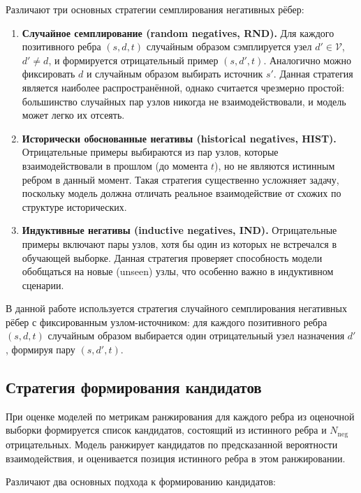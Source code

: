 \documentclass[a4paper,12pt]{extarticle}
\begin{document}
Различают три основных стратегии семплирования негативных рёбер:

\begin{enumerate}
    \item \textbf{Случайное семплирование (random negatives, RND).} Для каждого позитивного ребра $(s, d, t)$ случайным образом сэмплируется узел $d' \in \mathcal{V}$, $d' \neq d$, и формируется отрицательный пример $(s, d', t)$. Аналогично можно фиксировать $d$ и случайным образом выбирать источник $s'$. Данная стратегия является наиболее распространённой, однако считается чрезмерно простой: большинство случайных пар узлов никогда не взаимодействовали, и модель может легко их отсеять.

    \item \textbf{Исторически обоснованные негативы (historical negatives, HIST).} Отрицательные примеры выбираются из пар узлов, которые взаимодействовали в прошлом (до момента $t$), но не являются истинным ребром в данный момент. Такая стратегия существенно усложняет задачу, поскольку модель должна отличать реальное взаимодействие от схожих по структуре исторических.

    \item \textbf{Индуктивные негативы (inductive negatives, IND).} Отрицательные примеры включают пары узлов, хотя бы один из которых не встречался в обучающей выборке. Данная стратегия проверяет способность модели обобщаться на новые (unseen) узлы, что особенно важно в индуктивном сценарии.
\end{enumerate}

В данной работе используется стратегия случайного семплирования негативных рёбер с фиксированным узлом-источником: для каждого позитивного ребра $(s, d, t)$ случайным образом выбирается один отрицательный узел назначения $d'$, формируя пару $(s, d', t)$.

\subsection{Стратегия формирования кандидатов}

При оценке моделей по метрикам ранжирования для каждого ребра из оценочной выборки формируется список кандидатов, состоящий из истинного ребра и $N_{\text{neg}}$ отрицательных. Модель ранжирует кандидатов по предсказанной вероятности взаимодействия, и оценивается позиция истинного ребра в этом ранжировании.

Различают два основных подхода к формированию кандидатов:
\end{document}
